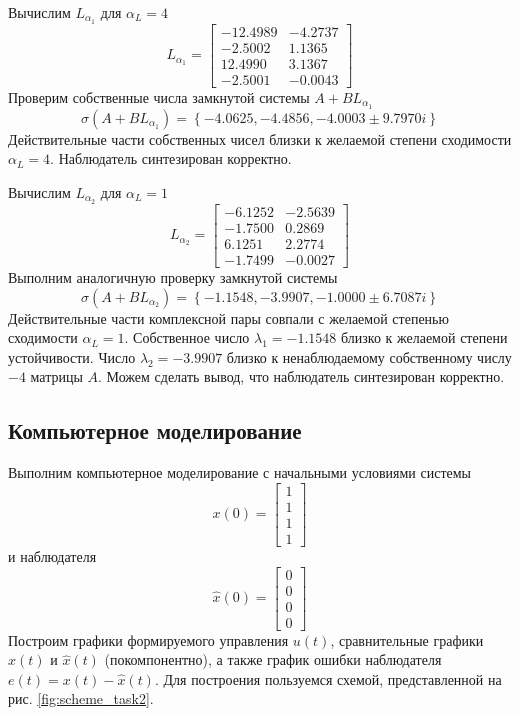 \documentclass[a4paper, 12pt]{article}
\begin{document}
    Вычислим $L_{\alpha_1}$ для $\alpha_L=4$
    $$
    L_{\alpha_1}=\begin{bmatrix}
    -12.4989   &-4.2737\\
   -2.5002    &1.1365\\
   12.4990    &3.1367\\
   -2.5001   &-0.0043
    \end{bmatrix}
    $$
    Проверим собственные числа замкнутой системы $A+BL_{\alpha_1}$
    $$
    \sigma\left( A+BL_{\alpha_1} \right)=\left\{ -4.0625, -4.4856, -4.0003 \pm 9.7970i \right\}
    $$
    Действительные части собственных чисел близки к желаемой степени сходимости $\alpha_L=4$. Наблюдатель синтезирован корректно.


    Вычислим $L_{\alpha_2}$ для $\alpha_L=1$
    $$
    L_{\alpha_2}=\begin{bmatrix}
        -6.1252   &-2.5639\\
        -1.7500    &0.2869\\
         6.1251    &2.2774\\
        -1.7499   &-0.0027
    \end{bmatrix}
    $$
    Выполним аналогичную проверку замкнутой системы
    $$
    \sigma\left( A+BL_{\alpha_2} \right)=\left\{ -1.1548, -3.9907, -1.0000 \pm 6.7087i \right\}
    $$
    Действительные части комплексной пары совпали с желаемой степенью сходимости $\alpha_L=1$.
    Собственное число $\lambda_1=-1.1548$ близко к желаемой степени устойчивости. Число $\lambda_2=-3.9907$ близко к
    ненаблюдаемому собственному числу $-4$ матрицы $A$. Можем сделать вывод, что наблюдатель синтезирован корректно.


    \subsection{Компьютерное моделирование}
    Выполним компьютерное моделирование с начальными условиями системы
    $$
    x(0)=\begin{bmatrix}
        1\\1\\1\\1
    \end{bmatrix}
    $$
    и наблюдателя
    $$
    \hat{x}(0)=\begin{bmatrix}
        0\\0\\0\\0
    \end{bmatrix}
    $$
    Построим графики формируемого управления $u(t)$, сравнительные графики $x(t)$ и $\hat{x}(t)$ (покомпонентно),
    а также график ошибки наблюдателя $e(t)=x(t)-\hat{x}(t)$. Для построения пользуемся схемой, представленной на рис. \ref{fig:scheme_task2}.
\end{document}
